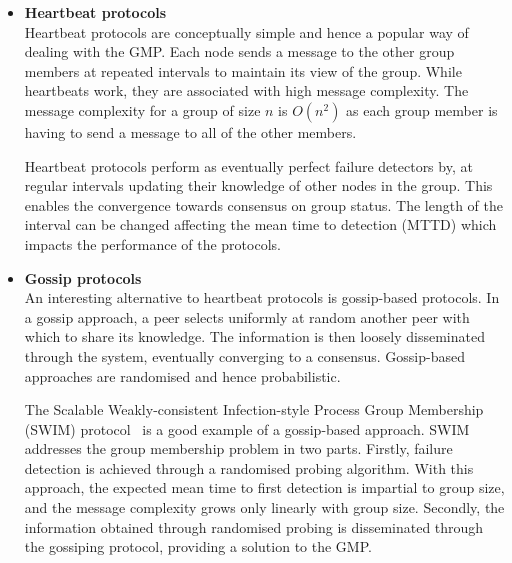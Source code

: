 \begin{itemize}
    \item \textbf{Heartbeat protocols}\\
    Heartbeat protocols are conceptually simple and hence a popular way of dealing with the GMP. Each node sends a message to the other group members at repeated intervals to maintain its view of the group. While heartbeats work, they are associated with high message complexity. The message complexity for a group of size $n$ is $O(n^2)$ as each group member is having to send a message to all of the other members.

    Heartbeat protocols perform as eventually perfect failure detectors by, at regular intervals updating their knowledge of other nodes in the group. This enables the convergence towards consensus on group status. The length of the interval can be changed affecting the mean time to detection (MTTD) which impacts the performance of the protocols.


    \item \textbf{Gossip protocols}\\
    An interesting alternative to heartbeat protocols is gossip-based protocols\cite{lindeberg2020scamp}. In a gossip approach, a peer selects uniformly at random another peer with which to share its knowledge. The information is then loosely disseminated through the system, eventually converging to a consensus. Gossip-based approaches are randomised and hence probabilistic.

    The Scalable Weakly-consistent Infection-style Process Group Membership (SWIM) protocol~\cite{das2002swim} is a good example of a gossip-based approach. SWIM addresses the group membership problem in two parts. Firstly, failure detection is achieved through a randomised probing algorithm. With this approach, the expected mean time to first detection is impartial to group size, and the message complexity grows only linearly with group size. Secondly, the information obtained through randomised probing is disseminated through the gossiping protocol, providing a solution to the GMP\cite{shinebourne2022availability}.

\end{itemize}

